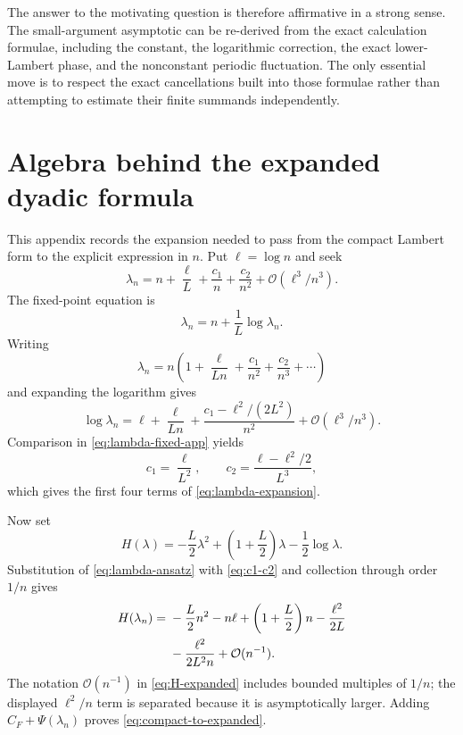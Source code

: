 \documentclass[11pt,oneside]{article}
\theoremstyle{definition}
\theoremstyle{remark}
\newcommand{\bigO}{\mathcal O}
\begin{document}
The answer to the motivating question is therefore affirmative in a strong sense.  The
small-argument asymptotic can be re-derived from the exact calculation formulae, including the
constant, the logarithmic correction, the exact lower-Lambert phase, and the nonconstant
periodic fluctuation.  The only essential move is to respect the exact cancellations built
into those formulae rather than attempting to estimate their finite summands independently.

\appendix

\section{Algebra behind the expanded dyadic formula}
\label{app:algebra}

This appendix records the expansion needed to pass from the compact Lambert form to the
explicit expression in $n$.  Put $\ell=\log n$ and seek
\begin{equation}
 \lambda_n=n+\frac\ell L+\frac{c_1}{n}+\frac{c_2}{n^2}
 +\bigO(\ell^3/n^3).                                       \label{eq:lambda-ansatz}
\end{equation}
The fixed-point equation is
\begin{equation}
 \lambda_n=n+\frac1L\log\lambda_n.                         \label{eq:lambda-fixed-app}
\end{equation}
Writing
\begin{equation*}
 \lambda_n=n\left(1+\frac\ell{Ln}+\frac{c_1}{n^2}
 +\frac{c_2}{n^3}+\cdots\right)
\end{equation*}
and expanding the logarithm gives
\begin{equation*}
 \log\lambda_n=
 \ell+\frac\ell{Ln}+\frac{c_1-\ell^2/(2L^2)}{n^2}
 +\bigO(\ell^3/n^3).
\end{equation*}
Comparison in \eqref{eq:lambda-fixed-app} yields
\begin{equation}
 c_1=\frac\ell{L^2},
 \qquad
 c_2=\frac{\ell-\ell^2/2}{L^3},                            \label{eq:c1-c2}
\end{equation}
which gives the first four terms of \eqref{eq:lambda-expansion}.

Now set
\begin{equation*}
 H(\lambda)=-\frac L2\lambda^2+
 \left(1+\frac L2\right)\lambda-\frac12\log\lambda.
\end{equation*}
Substitution of \eqref{eq:lambda-ansatz} with \eqref{eq:c1-c2} and collection through order
$1/n$ gives
\begin{align}
 H(\lambda_n)={}&-\frac L2n^2-n\ell+
 \left(1+\frac L2\right)n-\frac{\ell^2}{2L}                \notag\\
 &-\frac{\ell^2}{2L^2n}+\bigO(n^{-1}).                    \label{eq:H-expanded}
\end{align}
The notation $\bigO(n^{-1})$ in \eqref{eq:H-expanded} includes bounded multiples of $1/n$;
the displayed $\ell^2/n$ term is separated because it is asymptotically larger.  Adding
$C_F+\Psi(\lambda_n)$ proves \eqref{eq:compact-to-expanded}.
\end{document}
